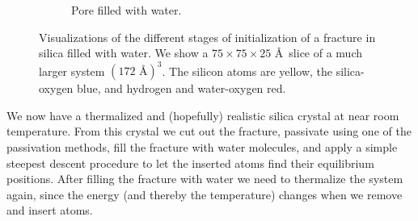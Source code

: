 \begin{figure}[htpb]
\begin{subfigure}[t]{\myfigwidth}
        \caption{%
            Pore filled with water.%
            \label{fig:initialization_step05}%
        }%
        \hspace{8pt}
    \end{subfigure}%
    \captionsetup{width=\textwidth}%
    \caption{%
        Visualizations of the different stages of initialization of a fracture in silica filled with water. We show a $75\times 75\times 25$ \AA\ slice of a much larger system $(172 \text{ \AA})^3$. The silicon atoms are yellow, the silica-oxygen blue, and hydrogen and water-oxygen red. %
        \label{fig:initialization_steps}%
    }%
\end{figure}%

We now have a thermalized and (hopefully) realistic silica crystal at near room temperature. From this crystal we cut out the fracture, passivate using one of the passivation methods, fill the fracture with water molecules, and apply a simple steepest descent procedure to let the inserted atoms find their equilibrium positions. After filling the fracture with water we need to thermalize the system again, since the energy (and thereby the temperature) changes when we remove and insert atoms.